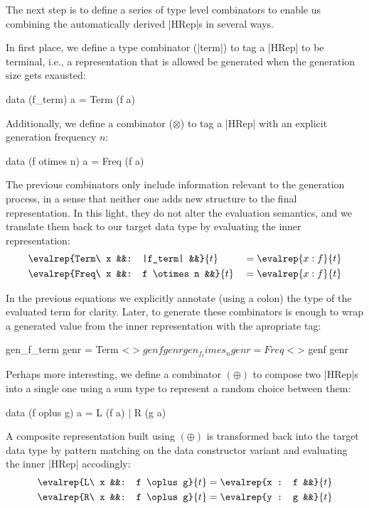 The next step is to define a series of type level combinators to enable us
combining the automatically derived |HRep|s in several ways.


In first place, we define a type combinator (|term|) to tag a |HRep| to be
terminal, i.e., a representation that is allowed be generated when the
generation size gets exausted:
%
\begin{code}
data (f_term) a = Term (f a)
\end{code}

Additionally, we define a combinator ($\otimes$) to tag a |HRep| with an
explicit generation frequency $n$:

\begin{code}
data (f otimes n) a = Freq (f a)
\end{code}

The previous combinators only include information relevant to the generation
process, in a sense that neither one adds new structure to the final
representation.
%
In this light, they do not alter the evaluation semantics, and we translate them
back to our target data type by evaluating the inner representation:
%
\begin{alignat*}{4}
  &\evalrep{Term\ x &&: |f_term|    &&}{t} &&= \evalrep{x : f}{t} \\
  &\evalrep{Freq\ x &&: f \otimes n &&}{t} &&= \evalrep{x : f}{t}
\end{alignat*}

In the previous equations we explicitly annotate (using a colon) the type of the
evaluated term for clarity.
%
Later, to generate these combinators is enough to wrap a generated value from
the inner representation with the apropriate tag:

\begin{code}
gen_f_term     genr  = Term  <$> genf genr

gen_f_times_n  genr  = Freq  <$> genf genr
\end{code}


Perhaps more interesting, we define a combinator $(\oplus)$ to compose two
|HRep|s into a single one using a sum type to represent a random choice between
them:

\begin{code}
data (f oplus g) a = L (f a) | R (g a)
\end{code}

A composite representation built using $(\oplus)$ is transformed back into the
target data type by pattern matching on the data constructor variant and
evaluating the inner |HRep| accodingly:
%
\begin{alignat*}{3}
  &\evalrep{L\ x &&: f \oplus g}{t} = \evalrep{x : f &&}{t} \\
  &\evalrep{R\ x &&: f \oplus g}{t} = \evalrep{y : g &&}{t}
\end{alignat*}

